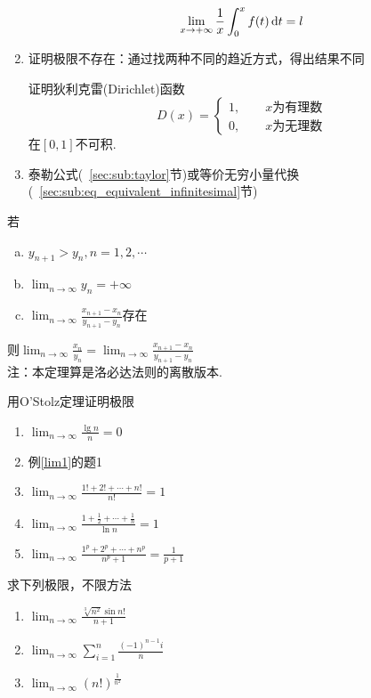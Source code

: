 \begin{enumerate}
\begin{exercise}
	\[\lim_{x\to+\infty}\frac{1}{x}\int_0^xf(t)\,\mathrm{d} t=l\]
	\end{exercise}
	\item 证明极限不存在：通过找两种不同的趋近方式，得出结果不同
	\begin{exercise}
	证明狄利克雷(Dirichlet)函数
	\[D(x)=\begin{cases}
	1,\qquad x\mbox{为有理数}\\
	0,\qquad x\mbox{为无理数}\end{cases}\]
	在$[0,1]$不可积.
	\end{exercise}
	\item 泰勒公式(~\ref{sec:sub:taylor}节)或等价无穷小量代换(~\ref{sec:sub:eq_equivalent_infinitesimal}节)
\end{enumerate}
\begin{theorem}%
若\begin{enumerate}[(a)]
	\item $y_{n+1}>y_n,n=1,2,\cdots$
	\item $\displaystyle\lim_{n\to\infty}y_n=+\infty$
	\item $\displaystyle\lim_{n\to\infty}\frac{x_{n+1}-x_n}{y_{n+1}-y_n}$存在
\end{enumerate}
则$\displaystyle\lim_{n\to\infty}\frac{x_n}{y_n}=\lim_{n\to\infty}\frac{x_{n+1}-x_n}{y_{n+1}-y_n}$\\
注：本定理算是洛必达法则的离散版本.
\end{theorem}
\begin{exercise}
用O'Stolz定理证明极限
\begin{enumerate}
	\item $\displaystyle\lim_{n\to\infty}\frac{\lg n}{n}=0$
	\item 例\ref{lim1}的题1
	\item $\displaystyle\lim_{n\to\infty}\frac{1!+2!+\cdots+n!}{n!}=1$
	\item $\displaystyle\lim_{n\to\infty}\frac{1+\frac{1}{2}+\cdots+\frac{1}{n}}{\ln n}=1$
	\item $\displaystyle\lim_{n\to\infty}\frac{1^p+2^p+\cdots+n^p}{n^p+1}=\frac{1}{p+1}$
\end{enumerate}
\end{exercise}
\begin{exercise}
求下列极限，不限方法
\begin{enumerate}
	\item $\displaystyle\lim_{n\to\infty}\frac{\sqrt[3]{n^2}\sin n!}{n+1}$
	\item $\displaystyle\lim_{n\to\infty}\sum_{i=1}^n\frac{(-1)^{n-1}i}{n}$
	\item $\displaystyle\lim_{n\to\infty}(n!)^{\frac{1}{n^2}}$
\end{enumerate}
\end{exercise}


